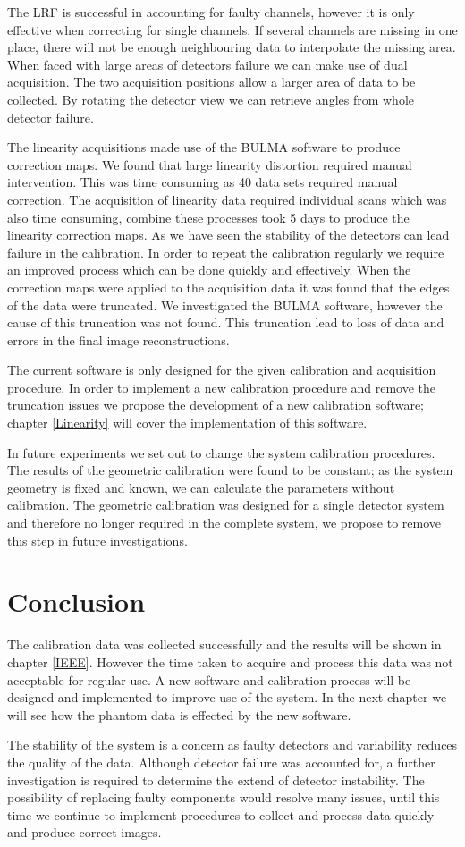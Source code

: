 The \acrshort{LRF} is successful in accounting for faulty channels, however it is only effective when correcting for single channels. If several channels are missing in one place, there will not be enough neighbouring data to interpolate the missing area. When faced with large areas of detectors failure we can make use of dual acquisition. The two acquisition positions allow a larger area of data to be collected. By rotating the detector view we can retrieve angles from whole detector failure.

The linearity acquisitions made use of the BULMA software to produce correction maps. We found that large linearity distortion required manual intervention. This was time consuming as 40 data sets required manual correction. The acquisition of linearity data required individual scans which was also time consuming, combine these processes took 5 days to produce the linearity correction maps. As we have seen the stability of the detectors can lead failure in the calibration. In order to repeat the calibration regularly we require an improved process which can be done quickly and effectively. When the correction maps were applied to the acquisition data it was found that the edges of the data were truncated. We investigated the BULMA software, however the cause of this truncation was not found. This truncation lead to loss of data and errors in the final image reconstructions. 

The current software is only designed for the given calibration and acquisition procedure. In order to implement a new calibration procedure and remove the truncation issues we propose the development of a new calibration software; chapter \ref{Linearity} will cover the implementation of this software. 

In future experiments we set out to change the system calibration procedures. The results of the geometric calibration were found to be constant; as the system geometry is fixed and known, we can calculate the parameters without calibration. The geometric calibration was designed for a single detector system and therefore no longer required in the complete system, we propose to remove this step in future investigations.

\section{Conclusion}
The calibration data was collected successfully and the results will be shown in chapter \ref{IEEE}. However the time taken to acquire and process this data was not acceptable for regular use. A new software and calibration process will be designed and implemented to improve use of the system. In the next chapter we will see how the phantom data is effected by the new software.

The stability of the system is a concern as faulty detectors and variability reduces the quality of the data. Although detector failure was accounted for, a further investigation is required to determine the extend of detector instability. The possibility of replacing faulty components would resolve many issues, until this time we continue to implement procedures to collect and process data quickly and  produce correct images.
